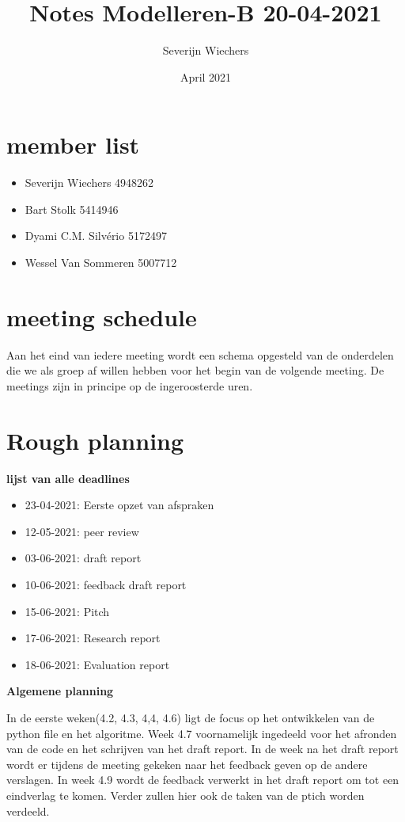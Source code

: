 \documentclass{article}
\title{Notes Modelleren-B 20-04-2021}
\author{Severijn Wiechers}
\date{April 2021}
\begin{document}
\maketitle

\section*{member list}

\begin{itemize}
    \item Severijn Wiechers 4948262
    \item Bart Stolk 5414946
    \item Dyami C.M. Silvério 5172497
    \item Wessel Van Sommeren 5007712
\end{itemize}


\section*{meeting schedule} 

Aan het eind van iedere meeting wordt een schema opgesteld van de onderdelen die we als groep af willen hebben voor het begin van de volgende meeting. De meetings zijn in principe op de ingeroosterde uren. 




\section*{Rough planning}
\textbf{lijst van alle deadlines}
\begin{itemize}
    \item 23-04-2021: Eerste opzet van afspraken
    \item 12-05-2021: peer review
    \item 03-06-2021: draft report
    \item 10-06-2021: feedback draft report
    \item 15-06-2021: Pitch
    \item 17-06-2021: Research report
    \item 18-06-2021: Evaluation report 
\end{itemize}
\textbf{Algemene planning}

In de eerste weken(4.2, 4.3, 4,4, 4.6) ligt de focus op het ontwikkelen van de python file en het algoritme. Week 4.7 voornamelijk ingedeeld voor het afronden van de code en het schrijven van het draft report. In de week na het draft report wordt er tijdens de meeting gekeken naar het feedback geven op de andere verslagen. In week 4.9 wordt de feedback verwerkt in het draft report om tot een eindverlag te komen. Verder zullen hier ook de taken van de ptich worden verdeeld.
\end{document}
